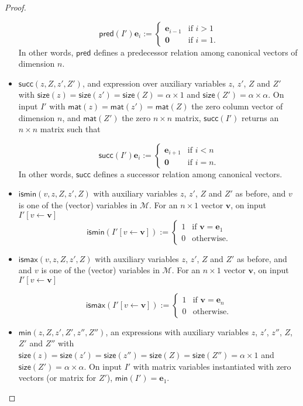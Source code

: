 \begin{proof}
\begin{itemize}
	 $$\mathsf{pred}(I')\mathbf{e}_i:=\begin{cases} 
	 \mathbf{e}_{i-1} & \text{if $i>1$}\\
	 \mathbf{0} & \text{if $i=1$}.
	\end{cases}
	$$
	In other words, $\mathsf{pred}$ defines a predecessor relation among canonical vectors of dimension $n$.
	 \item $\mathsf{succ}(z,Z,z',Z')$, and expression over auxiliary variables $z$, $z'$, $Z$ and $Z'$ with $\mathsf{size}(z)=\mathsf{size}(z')=\mathsf{size}(Z)=\alpha\times 1$ and $\mathsf{size}(Z')=\alpha\times\alpha$. On input $I'$ with 
	$\mathsf{mat}(z)=\mathsf{mat}(z')=\mathsf{mat}(Z)$ the zero column vector of dimension $n$, and $\mathsf{mat}(Z')$ the zero $n\times n$ matrix,
	 $\mathsf{succ}(I')$ returns an $n\times n$ matrix such that 
	 
	 $$\mathsf{succ}(I')\mathbf{e}_i:=\begin{cases} 
	 \mathbf{e}_{i+1} & \text{if $i<n$}\\
	 \mathbf{0} & \text{if $i=n$}.
	\end{cases}
	$$
	In other words, $\mathsf{succ}$ defines a successor relation among canonical vectors.
	\item $\textsf{ismin}(v,z,Z,z',Z)$ with auxiliary variables $z$, $z'$, $Z$ and $Z'$ as before, and $v$ is one of the (vector) variables in $\mathcal{M}$. For an $n\times 1$ vector $\mathbf{v}$, on input $I'[v\gets \mathbf{v}]$	$$\mathsf{ismin}(I'[v\gets\mathbf{v}]):=\begin{cases} 1 & \text{if $\mathbf{v}=\mathbf{e}_1$}\\
		0 & \text{otherwise}.
		\end{cases}$$
	\item $\textsf{ismax}(v,z,Z,z',Z)$ with auxiliary variables $z$, $z'$, $Z$ and $Z'$ as before, and 
	and $v$ is one of the (vector) variables in $\mathcal{M}$. For an $n\times 1$ vector $\mathbf{v}$, on input $I'[v\gets \mathbf{v}]$
	
	$$\mathsf{ismax}(I'[v\gets\mathbf{v}]):=\begin{cases} 1 & \text{if $\mathbf{v}=\mathbf{e}_{n}$}\\
		0 & \text{otherwise}.
		\end{cases}$$
	\item $\mathsf{min}(z,Z,z',Z',z'',Z'')$, an expressions with
	auxiliary variables $z$, $z'$, $z''$, $Z$, $Z'$ and $Z''$ with $\mathsf{size}(z)=\mathsf{size}(z')=\mathsf{size}(z'')=\mathsf{size}(Z)=\mathsf{size}(Z'')=\alpha\times 1$ and $\mathsf{size}(Z')=\alpha\times\alpha$. On input $I'$ with 
	matrix variables instantiated with zero vectors (or matrix for $Z'$),
 	 $\mathsf{min}(I')=\mathbf{e}_1$. 
	 		

\end{itemize}
\end{proof}
